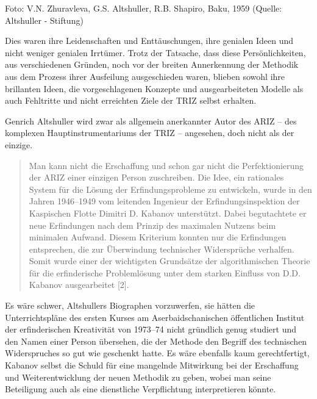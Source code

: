 \documentclass[11pt,a4paper]{article}
\begin{document}
Foto: V.N. Zhuravleva, G.S. Altshuller, R.B. Shapiro, Baku, 1959 (Quelle:
Altshuller - Stiftung)

Dies waren ihre Leidenschaften und Enttäuschungen, ihre genialen Ideen und
nicht weniger genialen Irrtümer. Trotz der Tatsache, dass diese
Persönlichkeiten, aus verschiedenen Gründen, noch vor der breiten Annerkennung
der Methodik aus dem Prozess ihrer Ausfeilung ausgeschieden waren, blieben
sowohl ihre brillanten Ideen, die vorgeschlagenen Konzepte und ausgearbeiteten
Modelle als auch Fehltritte und nicht erreichten Ziele der TRIZ selbst
erhalten.

Genrich Altshuller wird zwar als allgemein anerkannter Autor des ARIZ – des
komplexen Hauptinstrumentariums der TRIZ – angesehen, doch nicht als der
einzige.
\begin{quote}
  Man kann nicht die Erschaffung und schon gar nicht die Perfektionierung der
  ARIZ einer einzigen Person zuschreiben. Die Idee, ein rationales System für
  die Lösung der Erfindungsprobleme zu entwickeln, wurde in den Jahren
  1946--1949 vom leitenden Ingenieur der Erfindungsinspektion der Kaspischen
  Flotte Dimitri D. Kabanov unterstützt. Dabei begutachtete er neue
  Erfindungen nach dem Prinzip des maximalen Nutzens beim minimalen Aufwand.
  Diesem Kriterium konnten nur die Erfindungen entsprechen, die zur
  Überwindung technischer Widersprüche verhalfen.  Somit wurde einer der
  wichtigsten Grundsätze der algorithmischen Theorie für die erfinderische
  Problemlösung unter dem starken Einfluss von D.D. Kabanov ausgearbeitet [2].
\end{quote}
Es wäre schwer, Altshullers Biographen vorzuwerfen, sie hätten die
Unterrichtspläne des ersten Kurses am Aserbaidschanischen öffentlichen
Institut der erfinderischen Kreativität von 1973--74 nicht gründlich genug
studiert und den Namen einer Person übersehen, die der Methode den Begriff des
technischen Widerspruches so gut wie geschenkt hatte. Es wäre ebenfalls kaum
gerechtfertigt, Kabanov selbst die Schuld für eine mangelnde Mitwirkung bei
der Erschaffung und Weiterentwicklung der neuen Methodik zu geben, wobei man
seine Beteiligung auch als eine dienstliche Verpflichtung interpretieren
könnte.
\end{document}
